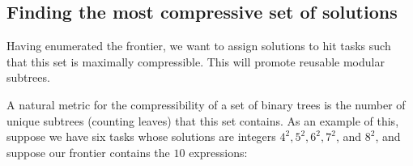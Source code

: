 \documentclass{article}
\begin{document}
\subsection{Finding the most compressive set of solutions}

Having enumerated the frontier, we want to assign solutions
to hit tasks such that this set is maximally compressible. This will
promote reusable modular subtrees. 

A natural metric for the compressibility of a set of binary trees is
the number of unique subtrees (counting leaves) that this
set contains. As an example of this, suppose we have six tasks whose
solutions are integers $4^2, 5^2, 6^2, 7^2$, and $8^2$, and suppose our
frontier contains the $10$ expressions:
\vspace{-.3cm}
\captionsetup[subfigure]{labelformat=empty} 
\end{document}
